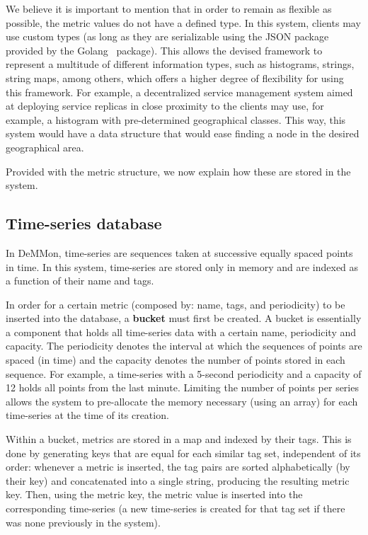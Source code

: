 We believe it is important to mention that in order to remain as flexible as possible, the metric values do not have a defined type. In this system, clients may use custom types (as long as they are serializable using the JSON package provided by the Golang~\cite{golang} package). This allows the devised framework to represent a multitude of different information types, such as histograms, strings, string maps, among others, which offers a higher degree of flexibility for using this framework. For example, a decentralized service management system aimed at deploying service replicas in close proximity to the clients may use, for example, a histogram with pre-determined geographical classes. This way, this system would have a data structure that would ease finding a node in the desired geographical area.

Provided with the metric structure, we now explain how these are stored in the system. 

\subsection{Time-series database}  \label{sec:mon_module:tsdb}

In DeMMon, time-series are sequences taken at successive equally spaced points in time. In this system, time-series are stored only in memory and are indexed as a function of their name and tags.

In order for a certain metric (composed by: name, tags, and periodicity) to be inserted into the database, a \textbf{bucket} must first be created. A bucket is essentially a component that holds all time-series data with a certain name, periodicity and capacity. The periodicity denotes the interval at which the sequences of points are spaced (in time) and the capacity denotes the number of points stored in each sequence. For example, a time-series with a 5-second periodicity and a capacity of 12 holds all points from the last minute. Limiting the number of points per series allows the system to pre-allocate the memory necessary (using an array) for each time-series at the time of its creation.

Within a bucket, metrics are stored in a map and indexed by their tags. This is done by generating keys that are equal for each similar tag set, independent of its order: whenever a metric is inserted, the tag pairs are sorted alphabetically (by their key) and concatenated into a single string, producing the resulting metric key. Then, using the metric key, the metric value is inserted into the corresponding time-series (a new time-series is created for that tag set if there was none previously in the system).

